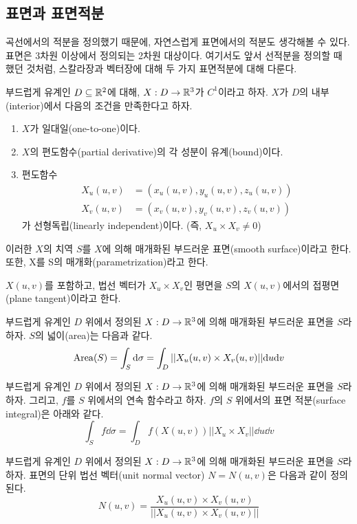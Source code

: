\subsection{표면과 표면적분}
곡선에서의 적분을 정의했기 때문에, 자연스럽게 표면에서의 적분도 생각해볼 수 있다. 표면은 3차원 이상에서 정의되는 2차원 대상이다. 여기서도 앞서 선적분을 정의할 때 했던 것처럼, 스칼라장과 벡터장에 대해 두 가지 표면적분에 대해 다룬다.
\begin{definition}[부드러운 표면]
부드럽게 유계인 $D\subseteq\mathbb{R}^2$에 대해, $X:D\to\mathbb{R}^3$가 $C^1$이라고 하자. $X$가 $D$의 내부(interior)에서 다음의 조건을 만족한다고 하자.
\begin{enumerate}[label=(\alph*)]
    \item $X$가 일대일(one-to-one)이다.
    \item $X$의 편도함수(partial derivative)의 각 성분이 유계(bound)이다.
    \item 편도함수
    \begin{align*}
    X_u(u,v)&=(x_u(u,v),y_u(u,v),z_u(u,v))\\
    X_v(u,v)&=(x_v(u,v),y_v(u,v),z_v(u,v))
    \end{align*}
    가 선형독립(linearly independent)이다. (즉, $X_u \times X_v \neq 0$)
\end{enumerate}
이러한 $X$의 치역 $S$를 $X$에 의해 매개화된 부드러운 표면(smooth surface)이라고 한다. 또한, X를 S의 매개화(parametrization)라고 한다.
\end{definition}
$X(u,v)$를 포함하고, 법선 벡터가 $X_u \times X_v$인 평면을 $S$의 $X(u,v)$에서의 접평면(plane tangent)이라고 한다.
\begin{definition}[표면의 넓이]
부드럽게 유계인 $D$ 위에서 정의된 $X:D\to\mathbb{R}^3$에 의해 매개화된 부드러운 표면을 $S$라 하자. $S$의 넓이(area)는 다음과 같다.
$$
\mathrm{Area}(S)=\int_S \dd \sigma = \int_D ||X_u(u,v) \times X_v(u,v)|| \dd u\dd v
$$
\end{definition}

\begin{definition}[스칼라장에서의 표면 적분]
부드럽게 유계인 $D$ 위에서 정의된 $X:D\to\mathbb{R}^3$에 의해 매개화된 부드러운 표면을 $S$라 하자. 그리고, $f$를 $S$ 위에서의 연속 함수라고 하자. $f$의 $S$ 위에서의 표면 적분(surface integral)은 아래와 같다.
$$
\int_S f\dd \sigma = \int_D f(X(u,v)) ||X_u \times X_v|| \dd u\dd v
$$
\end{definition}

\begin{definition}[표면의 단위 법선 벡터]
부드럽게 유계인 $D$ 위에서 정의된 $X:D\to\mathbb{R}^3$에 의해 매개화된 부드러운 표면을 $S$라 하자. 표면의 단위 법선 벡터(unit normal vector) $N=N(u,v)$은 다음과 같이 정의된다.
$$
N(u,v)=\frac{X_u(u,v) \times X_v(u,v)}{||X_u(u,v) \times X_v(u,v)||}
$$
\end{definition}

